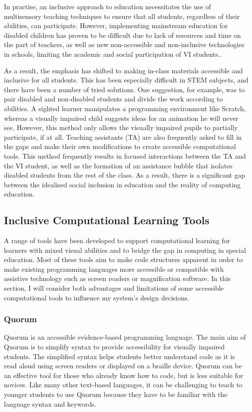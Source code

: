 \documentclass[oneside,%
                    author={Malak Hajji},
                    degree={BSc},
                    title={Designing An Accessible Ozobot Programming Platform for Students},
                  subtitle={With Mixed Visual Abilities}]{dissertation}
\begin{document}
In practise, an inclusive approach to education necessitates the use of multisensory teaching techniques to ensure that all students, regardless of their abilities, can participate. However, implementing mainstream education for disabled children has proven to be difficult due to lack of resources and time on the part of teachers, as well as new non-accessible and non-inclusive technologies in schools, limiting the academic and social participation of VI students.\cite{gray}. 

As a result, the emphasis has shifted to making in-class materials accessible and inclusive for all students. This has been especially difficult in STEM subjects\cite{moon}, and there have been a number of tried solutions. One suggestion, for example, was to pair disabled and non-disabled students and divide the work according to abilities. A sighted learner manipulates a programming environment like Scratch, whereas a visually impaired child suggests ideas for an animation he will never see. However, this method only allows the visually impaired pupils to partially participate, if at all. Teaching assistants (TA) are also frequently asked to fill in the gaps and make their own modifications to create accessible computational tools. This method frequently results in focused interactions between the TA and the VI student, as well as the formation of an assistance bubble that isolates disabled students from the rest of the class\cite{metatla}. As a result, there is a significant gap between the idealised social inclusion in education and the reality of computing education.

\subsection{Inclusive Computational Learning Tools}

A range of tools have been developed to support computational learning for learners with mixed visual abilities and to bridge the gap in computing in special education. Most of these tools aim to make code structures apparent in order to make existing programming languages more accessible or compatible with assistive technology such as screen readers or magnification software. In this section, I will consider both advantages and limitations of some accessible computational tools to influence my system’s design decisions. 

\subsubsection{Quorum}
Quorum \cite{quorum}is an accessible evidence-based programming language. The main aim of Quorum is to simplify syntax to provide accessibility for visually impaired students. The simplified syntax helps students better understand code as it is read aloud using screen readers or displayed on a braille device. Quorum can be an effective tool for those who already know how to code, but is less suitable for novices. Like many other text-based languages, it can be challenging to teach to younger students to use Quorum because they have to be familiar with the language syntax and keywords.
\end{document}
